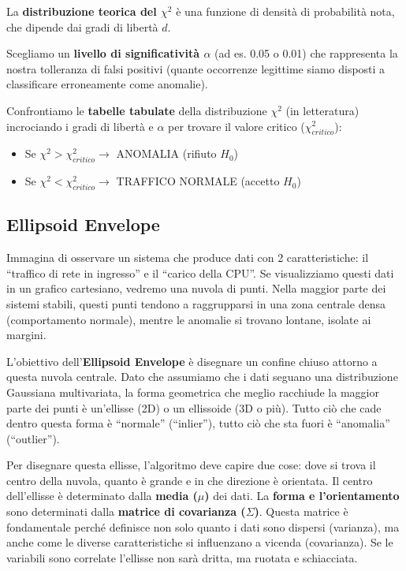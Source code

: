 La \textbf{distribuzione teorica del $\chi^2$} è una funzione
di densità di probabilità nota, che dipende dai gradi di
libertà $d$.

Scegliamo un \textbf{livello di significatività $\alpha$}
(ad es. 0.05 o 0.01) che rappresenta la nostra tolleranza di
falsi positivi (quante occorrenze legittime siamo disposti a
classificare erroneamente come anomalie).

Confrontiamo le \textbf{tabelle tabulate} della distribuzione
$\chi^2$ (in letteratura) incrociando i gradi di libertà e
$\alpha$ per trovare il valore critico ($\chi^2_{critico}$):
\begin{itemize}
    \item Se $\chi^2 > \chi^2_{critico}
          \rightarrow$ ANOMALIA (rifiuto $H_0$)
    \item Se $\chi^2 < \chi^2_{critico}
          \rightarrow$ TRAFFICO NORMALE (accetto $H_0$)
\end{itemize}

\subsection{Ellipsoid Envelope}

Immagina di osservare un sistema che produce dati con 2
caratteristiche: il ``traffico di rete in ingresso'' e il
``carico della CPU''. Se visualizziamo questi dati in un
grafico cartesiano, vedremo una nuvola di punti. Nella
maggior parte dei sistemi stabili, questi punti tendono a
raggrupparsi in una zona centrale densa (comportamento normale),
mentre le anomalie si trovano lontane, isolate ai margini.

L'obiettivo dell'\textbf{Ellipsoid Envelope} è disegnare un
confine chiuso attorno a questa nuvola centrale. Dato che
assumiamo che i dati seguano una distribuzione Gaussiana
multivariata, la forma geometrica che meglio racchiude la
maggior parte dei punti è un'ellisse (2D) o un ellissoide
(3D o più). Tutto ciò che cade dentro questa forma è
``normale'' (``inlier''), tutto ciò che sta fuori è
``anomalia'' (``outlier'').

Per disegnare questa ellisse, l'algoritmo deve capire due cose:
dove si trova il centro della nuvola, quanto è grande e in che
direzione è orientata. Il centro dell'ellisse è determinato
dalla \textbf{media ($\mu$)} dei dati. La \textbf{forma e
l'orientamento} sono determinati dalla \textbf{matrice di
covarianza ($\Sigma$)}. Questa matrice è fondamentale perché
definisce non solo quanto i dati sono dispersi (varianza), ma
anche come le diverse caratteristiche si influenzano a vicenda
(covarianza). Se le variabili sono correlate l'ellisse non sarà
dritta, ma ruotata e schiacciata.

